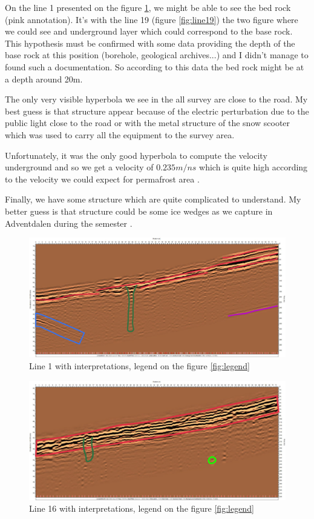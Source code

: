 On the line 1 presented on the figure \ref{fig:line1}, we might be able to see the bed rock (pink annotation). It's with the line 19 (figure \ref{fig:line19}) the two figure where we could see and underground layer which could correspond to the base rock. This hypothesis must be confirmed with some data providing the depth of the base rock at this position (borehole, geological archives...) and I didn't manage to found such a documentation. So according to this data the bed rock might be at a depth around 20m.

The only very visible hyperbola we see in the all survey are close to the road. My best guess is that structure appear because of the electric perturbation due to the public light close to the road or with the metal structure of the snow scooter which was used to carry all the equipment to the survey area. 

Unfortunately, it was the only good hyperbola to compute the velocity underground and so we get a velocity of $0.235m/ns$ which is quite high according to the velocity we could expect for permafrost area \cite{GPRAnalysis}.

Finally, we have some structure which are quite complicated to understand. My better guess is that structure could be some ice wedges as we capture in Adventdalen during the semester \cite{UNIS211-GPRReport}.

\begin{figure} [p]
    \centering
    \includegraphics[width=\linewidth]{Images/00_Results/line1_edited.jpg}
    \caption{Line 1 with interpretations, legend on the figure \ref{fig:legend}}
    \label{fig:line1}
\end{figure}

\begin{figure}[p]
    \centering
    \includegraphics[width=\linewidth]{Images/00_Results/line16_edited.jpg}
    \caption{Line 16 with interpretations, legend on the figure \ref{fig:legend}}
    \label{fig:line16}
\end{figure}

